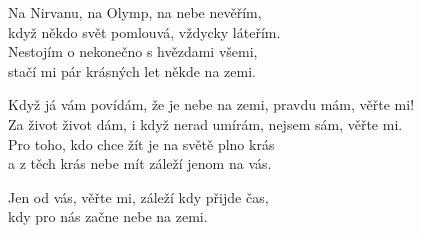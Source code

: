  
\vspace{10pt}

\nv{}Na Nirvanu, na Olymp, na nebe nevěřím,\\
když někdo svět pomlouvá, vždycky láteřím.\\
Nestojím o nekonečno s hvězdami všemi,\\
stačí mi pár krásných let někde na zemi.
\vnv

\nv{}Když já vám povídám, že je nebe na zemi, pravdu mám, věřte mi!\\
Za život život dám, i když nerad umírám, nejsem sám, věřte mi.\\
\nv Pro toho, kdo chce  \sm žít je na světě plno krás\\
a z těch krás nebe mít záleží jenom na vás.
\vnv

\nv{}Jen od vás, věřte mi, záleží kdy přijde čas,\\
kdy pro nás začne nebe na zemi.
\newpage
